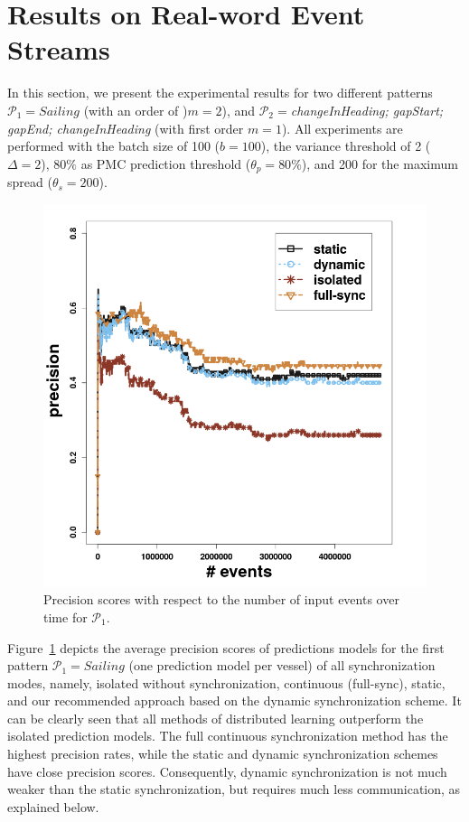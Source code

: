 \section{Results on Real-word Event Streams}
\label{sec:results_real}

In this section, we present the experimental results for two different patterns  $\mathcal{P}_1=Sailing$ (with an order of )$m=2$), and   $\mathcal{P}_2=$\textit{changeInHeading; gapStart; gapEnd; changeInHeading} (with first order $m=1$). All experiments are performed with the batch size of 100  ($b=100$), the variance threshold of 2 ($\Delta=2$), $80\%$ as PMC prediction threshold ($\theta_{p}=80\%$), and 200 for the maximum spread ($\theta_{s}=200$).

\begin{figure}[H]
	\centering
	\includegraphics[width=\textwidth,height=.62\textheight]{chapters/figures/synopses/p1_precision_100_2_08.png}
	
	\caption{Precision scores with respect to the number of input events over time for $\mathcal{P}_1$.}
	\label{fig:precsions}
\end{figure}

\par Figure~\ref{fig:precsions} depicts the average precision scores of predictions models for the first pattern $\mathcal{P}_1=Sailing$ (one prediction model per vessel) of all synchronization modes, namely, isolated without synchronization, continuous (full-sync), static, and our recommended approach based on the dynamic synchronization scheme. It can be clearly seen that all methods of distributed learning outperform the isolated prediction models. The full continuous synchronization method has the highest precision rates, while the static and dynamic synchronization schemes have close precision scores. Consequently, dynamic synchronization is not much weaker than the static synchronization, but requires much less communication, as explained below.



